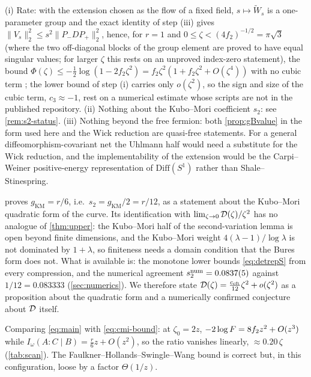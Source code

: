 \begin{remark}\label{rem:norate}
(i) Rate: with the extension chosen as the flow of a fixed field, $s\mapsto\widetilde W_s$ is a one-parameter group and the exact identity of step (iii) gives $\|V_s\|_2^2\le s^2\|P_-DP_+\|_2^2$, hence, for $r=1$ and $0\le\zeta<(4f_2)^{-1/2}=\pi\sqrt3$ (where the two off-diagonal blocks of the group element are proved to have equal singular values; for larger $\zeta$ this rests on an unproved index-zero statement), the bound $\Phi(\zeta)\le-\tfrac12\log(1-2f_2\zeta^2)=f_2\zeta^2(1+f_2\zeta^2+O(\zeta^4))$ with no cubic term \cite{RigorRR}; the lower bound of step (i) carries only $o(\zeta^2)$, so the sign and size of the cubic term, $c_3\approx-1$, rest on a numerical estimate whose scripts are not in the published repository.  (ii) Nothing about the Kubo--Mori coefficient
$s_2$: see \cref{rem:s2-status}.  (iii) Nothing beyond the free fermion: both
\cref{prop:gBvalue} in the form used here and the Wick reduction are quasi-free
statements.  For a general diffeomorphism-covariant net the Uhlmann half would
need a substitute for the Wick reduction, and the implementability of the
extension would be the Carpi--Weiner positive-energy representation of
$\mathrm{Diff}(S^1)$ rather than Shale--Stinespring.
\end{remark}

\begin{remark}[Status of $s_2$]\label{rem:s2-status}
 proves $g_{\mathrm{KM}}=r/6$, i.e.\
$s_2=g_{\mathrm{KM}}/2=r/12$, as a statement about the Kubo--Mori quadratic form
of the curve.  Its identification with $\lim_{\zeta\to0}\mathcal D(\zeta)/\zeta^2$ has no
analogue of \cref{thm:upper}: the Kubo--Mori half of the second-variation lemma
\cite{RigorSV} is open beyond finite dimensions, and the Kubo--Mori weight
$4(\lambda-1)/\log\lambda$ is not dominated by $1+\lambda$, so finiteness needs a
domain condition that the Bures form does not.  What is available is: the monotone
lower bounds \eqref{eq:detrepS} from every compression, and the numerical
agreement $s_2^{\rm num}=0.0837(5)$ against $1/12=0.083333$
(\cref{sec:numerics}).  We therefore state
$\mathcal D(\zeta)=\frac{c_{\rm cft}}{12}\zeta^2+o(\zeta^2)$ as a proposition about the
quadratic form and a numerically confirmed conjecture about $\mathcal D$ itself.
\end{remark}

\begin{remark}
Comparing \eqref{eq:main} with \eqref{eq:cmi-bound}: at $\zeta_0=2z$,
$-2\log F=8f_2z^2+O(z^3)$ while $I_\omega(A{:}C\mid B)=\frac r6z+O(z^2)$, so the
ratio vanishes linearly, $\approx0.20\,\zeta$ (\cref{tab:scan}).  The
Faulkner--Hollands--Swingle--Wang bound is correct but, in this configuration,
loose by a factor $\Theta(1/z)$.
\end{remark}
